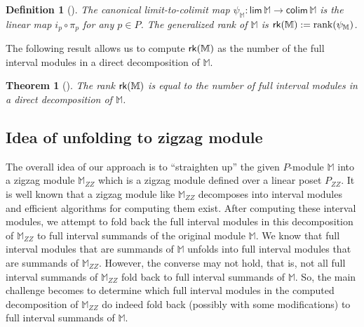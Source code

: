 \documentclass[11pt]{article}
\theoremstyle{plain}%
\newtheorem{theorem}{Theorem}[section]
\newtheorem{definition}{Definition}[section]
\newcommand{\rank}{\mathrm{rank}}
\newcommand{\M}{\mathbb{M}}
\newcommand{\rk}{{\sf{rk}}}
\newcommand{\limproj}{\mathsf{lim}}
\newcommand{\colim}{\mathsf{colim}}
\begin{document}
\begin{definition}[{\cite{kim2018generalized}}]\label{def:rank}
The \emph{canonical limit-to-colimit map $\psi_\M:\limproj\, \M\rightarrow \colim\, \M$} is the linear map $i_p\circ \pi_p$ for \emph{any} $p\in P$. The \emph{generalized rank} of $\M$ is $\rk(\M):=\rank(\psi_\M)$. 
\end{definition}

The following result allows us to compute $\rk(\M)$ as the number of the full interval modules in a direct decomposition of $\M$.
\begin{theorem}[{\cite[Lemma 3.1]{chambers2018persistent}}]
The rank $\rk(\M)$ is equal to the number of full interval modules in a direct decomposition of $\M$. 
\label{thm:rk}
\end{theorem}

\subsection{Idea of unfolding to zigzag module}
The overall idea of our approach is to ``straighten up'' the given $P$-module $\M$ into
a zigzag module $\M_{ZZ}$ which is a zigzag module defined over
a linear poset $P_{ZZ}$. It is well known that a zigzag module like $\M_{ZZ}$ decomposes into interval modules and efficient algorithms for computing them exist. After
computing these interval modules, we attempt to fold back the full interval modules in this
decomposition of $\M_{ZZ}$
to full interval summands of the original module $\M$. 
We know that full interval modules that are summands of $\M$ unfolds into
full interval modules that are summands of $\M_{ZZ}$. However, the converse may not hold, that is, not
all full interval summands of $\M_{ZZ}$ fold back to full interval summands of $\M$. 
So, the main challenge
becomes to determine which full interval modules in the computed decomposition of $\M_{ZZ}$ do indeed
fold back (possibly with some modifications) to full interval summands of $\M$. 
\end{document}
